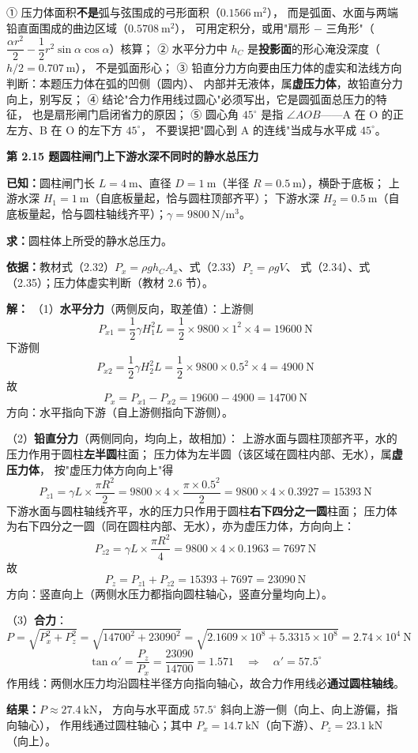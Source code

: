 \begin{yicuo}
① 压力体面积\textbf{不是}弧与弦围成的弓形面积（$0.1566\ \mathrm{m^2}$），
而是弧面、水面与两端铅直面围成的曲边区域（$0.5708\ \mathrm{m^2}$），
可用定积分，或用"扇形 $-$ 三角形"（$\dfrac{\alpha r^2}{2}-\dfrac{1}{2}r^2\sin\alpha\cos\alpha$）核算；
② 水平分力中 $h_C$ 是\textbf{投影面}的形心淹没深度（$h/2=0.707\ \mathrm{m}$），
不是弧面形心；
③ 铅直分力方向要由压力体的虚实和法线方向判断：本题压力体在弧的凹侧（圆内）、
内部并无液体，属\textbf{虚压力体}，故铅直分力向上，别写反；
④ 结论"合力作用线过圆心"必须写出，它是圆弧面总压力的特征，
也是扇形闸门启闭省力的原因；
⑤ 圆心角 $45^{\circ}$ 是指 $\angle AOB$——A 在 O 的正左方、B 在 O 的左下方 $45^{\circ}$，
不要误把"圆心到 A 的连线"当成与水平成 $45^{\circ}$。
\end{yicuo}

\noindent\textbf{第 2.15 题\quad 圆柱闸门上下游水深不同时的静水总压力}

\begin{jie}
\textbf{已知：}圆柱闸门长 $L=4\ \mathrm{m}$、直径 $D=1\ \mathrm{m}$（半径 $R=0.5\ \mathrm{m}$），横卧于底板；
上游水深 $H_1=1\ \mathrm{m}$（自底板量起，恰与圆柱顶部齐平）；
下游水深 $H_2=0.5\ \mathrm{m}$（自底板量起，恰与圆柱轴线齐平）；$\gamma=9800\ \mathrm{N/m^3}$。

\textbf{求：}圆柱体上所受的静水总压力。

\textbf{依据：}教材式（2.32）$P_x=\rho gh_CA_x$、式（2.33）$P_z=\rho gV$、
式（2.34）、式（2.35）；压力体虚实判断（教材 2.6 节）。

\textbf{解：}
（1）\textbf{水平分力}（两侧反向，取差值）：上游侧
\[ P_{x1}=\frac{1}{2}\gamma H_1^2L=\frac{1}{2}\times9800\times1^2\times4=19600\ \mathrm{N} \]
下游侧
\[ P_{x2}=\frac{1}{2}\gamma H_2^2L=\frac{1}{2}\times9800\times0.5^2\times4=4900\ \mathrm{N} \]
故
\[ P_x=P_{x1}-P_{x2}=19600-4900=14700\ \mathrm{N} \]
方向：水平指向下游（自上游侧指向下游侧）。

（2）\textbf{铅直分力}（两侧同向，均向上，故相加）：
上游水面与圆柱顶部齐平，水的压力作用于圆柱\textbf{左半圆}柱面；
压力体为左半圆（该区域在圆柱内部、无水），属\textbf{虚压力体}，
按"虚压力体方向向上"得
\[ P_{z1}=\gamma L\times\frac{\pi R^2}{2}=9800\times4\times\frac{\pi\times0.5^2}{2}
=9800\times4\times0.3927=15393\ \mathrm{N} \]
下游水面与圆柱轴线齐平，水的压力只作用于圆柱\textbf{右下四分之一圆}柱面；
压力体为右下四分之一圆（同在圆柱内部、无水），亦为虚压力体，方向向上：
\[ P_{z2}=\gamma L\times\frac{\pi R^2}{4}=9800\times4\times0.1963=7697\ \mathrm{N} \]
故
\[ P_z=P_{z1}+P_{z2}=15393+7697=23090\ \mathrm{N} \]
方向：竖直向上（两侧水压力都指向圆柱轴心，竖直分量均向上）。

（3）\textbf{合力}：
\[ P=\sqrt{P_x^2+P_z^2}=\sqrt{14700^2+23090^2}=\sqrt{2.1609\times10^8+5.3315\times10^8}
=2.74\times10^4\ \mathrm{N} \]
\[ \tan\alpha'=\frac{P_z}{P_x}=\frac{23090}{14700}=1.571\quad\Rightarrow\quad
\alpha'=57.5^{\circ} \]
作用线：两侧水压力均沿圆柱半径方向指向轴心，故合力作用线必\textbf{通过圆柱轴线}。

\textbf{结果：}$P\approx27.4\ \mathrm{kN}$，
方向与水平面成 $57.5^{\circ}$ 斜向上游一侧（向上、向上游偏，指向轴心），
作用线通过圆柱轴心；其中 $P_x=14.7\ \mathrm{kN}$（向下游）、$P_z=23.1\ \mathrm{kN}$（向上）。
\end{jie}

